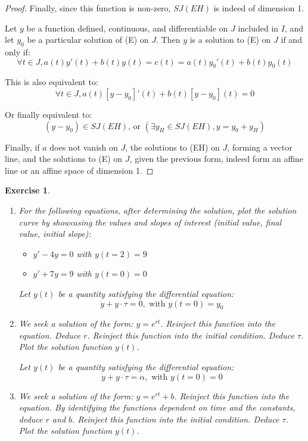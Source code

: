 \documentclass[french,12pt,a4paper]{book}
\newtheorem{exo}{Exercise}[chapter]
\numberwithin{equation}{chapter}
\begin{document}
\begin{proof}
Finally, since this function is non-zero, \( SJ(EH) \) is indeed of dimension 1.

Let \( y \) be a function defined, continuous, and differentiable on \( J \) included in \( I \), and let \( y_0 \) be a particular solution of (E) on \( J \). Then \( y \) is a solution to (E) on \( J \) if and only if:
\[ \forall t \in J, a(t)y'(t) + b(t)y(t) = c(t) = a(t)y_0'(t) + b(t)y_0(t) \]

This is also equivalent to:
\[ \forall t \in J, a(t)[y - y_0]'(t) + b(t)[y - y_0](t) = 0 \]

Or finally equivalent to:
\[ (y - y_0) \in SJ(EH) \text{, or } (\exists y_H \in SJ(EH), y = y_0 + y_H) \]

Finally, if \( a \) does not vanish on \( J \), the solutions to (EH) on \( J \), forming a vector line, and the solutions to (E) on \( J \), given the previous form, indeed form an affine line or an affine space of dimension 1.
\end{proof}

\begin{exo}
\begin{enumerate}
\item For the following equations, after determining the solution, plot the solution curve by showcasing the values and slopes of interest (initial value, final value, initial slope):
\begin{itemize}
    \item $y' - 4y = 0$ with $y(t = 2) = 9$
    \item $y' + 7y = 9$ with $y(t = 0) = 0$
\end{itemize}

Let $y(t)$ be a quantity satisfying the differential equation:
\[ \dot{y} + y \cdot \tau = 0, \text{ with } y(t = 0) = y_0 \]

\item  We seek a solution of the form: $y = e^{rt}$. Reinject this function into the equation. Deduce $r$. Reinject this function into the initial condition. Deduce $\tau$. Plot the solution function $y(t)$.

Let $y(t)$ be a quantity satisfying the differential equation:
\[ \dot{y} + y \cdot \tau = \alpha, \text{ with } y(t = 0) = 0 \]

\item We seek a solution of the form: $y = e^{rt} + b$. Reinject this function into the equation. By identifying the functions dependent on time and the constants, deduce $r$ and $b$. Reinject this function into the initial condition. Deduce $\tau$. Plot the solution function $y(t)$.
\end{enumerate}
\end{exo}
\end{document}
